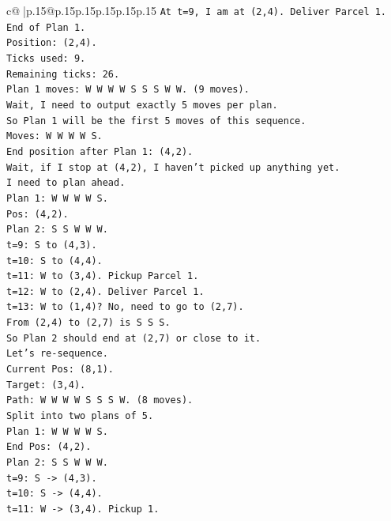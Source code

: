 \documentclass{article}
\begin{document}
{\begin{supertabular}{c@{$\;$}|p{.15\linewidth}@{}p{.15\linewidth}p{.15\linewidth}p{.15\linewidth}p{.15\linewidth}p{.15\linewidth}}
{{{\texttt{At t=9, I am at (2,4). Deliver Parcel 1.} \\
\texttt{End of Plan 1.} \\
\texttt{Position: (2,4).} \\
\texttt{Ticks used: 9.} \\
\texttt{Remaining ticks: 26.} \\
\texttt{Plan 1 moves: W W W W S S S W W. (9 moves).} \\
\texttt{Wait, I need to output exactly 5 moves per plan.} \\
\texttt{So Plan 1 will be the first 5 moves of this sequence.} \\
\texttt{Moves: W W W W S.} \\
\texttt{End position after Plan 1: (4,2).} \\
\texttt{Wait, if I stop at (4,2), I haven't picked up anything yet.} \\
\texttt{I need to plan ahead.} \\
\texttt{Plan 1: W W W W S.} \\
\texttt{Pos: (4,2).} \\
\texttt{Plan 2: S S W W W.} \\
\texttt{t=9: S to (4,3).} \\
\texttt{t=10: S to (4,4).} \\
\texttt{t=11: W to (3,4). Pickup Parcel 1.} \\
\texttt{t=12: W to (2,4). Deliver Parcel 1.} \\
\texttt{t=13: W to (1,4)? No, need to go to (2,7).} \\
\texttt{From (2,4) to (2,7) is S S S.} \\
\texttt{So Plan 2 should end at (2,7) or close to it.} \\
\texttt{Let's re{-}sequence.} \\
\texttt{Current Pos: (8,1).} \\
\texttt{Target: (3,4).} \\
\texttt{Path: W W W W S S S W. (8 moves).} \\
\texttt{Split into two plans of 5.} \\
\texttt{Plan 1: W W W W S.} \\
\texttt{End Pos: (4,2).} \\
\texttt{Plan 2: S S W W W.} \\
\texttt{t=9: S {-}> (4,3).} \\
\texttt{t=10: S {-}> (4,4).} \\
\texttt{t=11: W {-}> (3,4). Pickup 1.} \\
}}}
\end{supertabular}}
\end{document}
